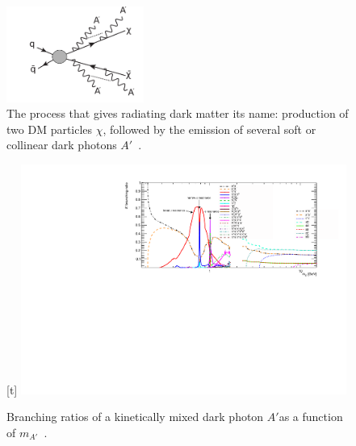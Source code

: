 \begin{figure}[t]
  \begin{center}
    \includegraphics[width=0.4\textwidth]{figures/DS_darkradiation.pdf}
  \end{center}
  \vspace{-0.7cm}
  \caption{The process that gives radiating dark matter its name: production of two DM particles $\chi$, followed by the emission of several soft or collinear dark photons $A'$~\cite{Buschmann:2015awa}.}
  \label{fig:radiating-dm-diagram}
\end{figure}

\begin{figure}
  \begin{center}[t]
    \includegraphics[width=0.95\textwidth]{figures/DS_DarkPhoton_BR.pdf}
  \end{center}
  \vspace{-0.7cm}
  \caption{Branching ratios of a kinetically mixed dark photon $A'$as a function of $m_{A'}$~\cite{Buschmann:2015awa}.}
  \label{fig:radiating-dm-BR}
\end{figure}

